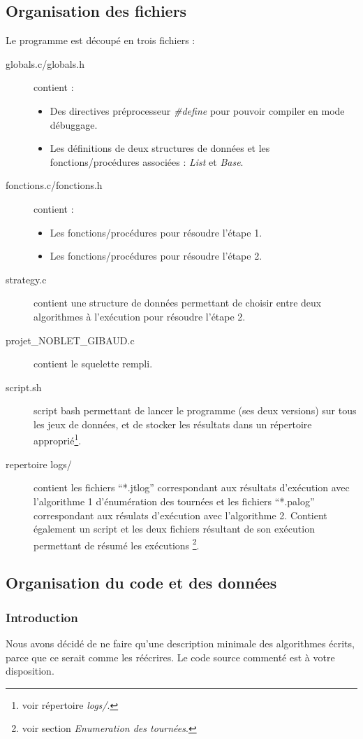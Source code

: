 \documentclass[a4paper,10pt]{article}
\begin{document}
\subsection{Organisation des fichiers}
Le programme est découpé en trois fichiers :
\begin{description}
\item[globals.c/globals.h] contient :
  \begin{itemize}
  \item Des directives préprocesseur \emph{\#define} pour pouvoir compiler en mode débuggage.
  \item Les définitions de deux structures de données et les fonctions/procédures associées : \emph{List} et \emph{Base}.
  \end{itemize}
\item[fonctions.c/fonctions.h] contient :
  \begin{itemize}
  \item Les fonctions/procédures pour résoudre l'étape 1.
  \item Les fonctions/procédures pour résoudre l'étape 2.
  \end{itemize}
\item[strategy.c] contient une structure de données permettant de choisir entre deux algorithmes à l'exécution
  pour résoudre l'étape 2.
\item[projet\_NOBLET\_GIBAUD.c] contient le squelette rempli.
\item[script.sh] script bash permettant de lancer le programme (ses deux versions) sur tous les jeux de données, et
  de stocker les résultats dans un répertoire approprié\footnote{voir répertoire \emph{logs/}.}.
\item[repertoire logs/] contient les fichiers ``*.jtlog'' correspondant aux résultats d'exécution avec l'algorithme 1
  d'énumération des tournées et les fichiers ``*.palog'' correspondant aux résulats d'exécution avec l'algorithme 2. 
  Contient également un script et les deux fichiers résultant de 
  son exécution permettant de résumé les exécutions  \footnote{voir section \emph{Enumeration des tournées}.}.
\end{description}
    
\subsection{Organisation du code et des données}

\subsubsection{Introduction}
Nous avons décidé de ne faire qu'une description minimale des algorithmes écrits,
parce que ce serait comme les réécrires.
Le code source commenté est à votre disposition.
\end{document}
